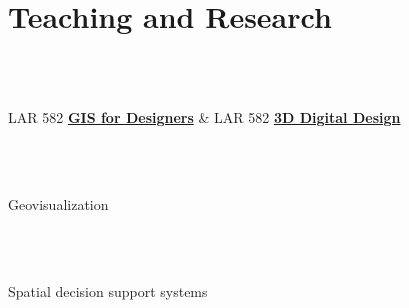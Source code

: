 \documentclass[]{baharmon-cv}
\begin{document}
{{{{{\section{Teaching and Research}
\begin{minipage}[t]{0.80\textwidth} 
\\
\end{minipage}
\begin{minipage}[t]{0.20\textwidth} 
\end{minipage}\\

LAR 582 \textbf{\href{http://www4.ncsu.edu/~baharmon/gisfordesigners/index.html}{GIS for Designers}}
\&
LAR 582 \textbf{\href{http://www4.ncsu.edu/~baharmon/teaching.html}{3D Digital Design}}
\\

\begin{minipage}[t]{0.80\textwidth} 
\\
\end{minipage}
\begin{minipage}[t]{0.20\textwidth} 
\end{minipage}\\

Geovisualization
\\

\begin{minipage}[t]{0.80\textwidth} 
\\
\end{minipage}
\begin{minipage}[t]{0.20\textwidth} 
\end{minipage}\\

Spatial decision support systems
\\

\begin{minipage}[t]{0.80\textwidth} 
\\
\end{minipage}
\begin{minipage}[t]{0.20\textwidth} 
\end{minipage}\\

}}}}}
\end{document}
